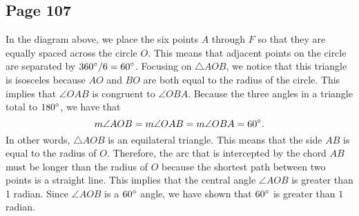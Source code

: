 \documentclass{article}
\newenvironment{solutions}[1]
{\subsection*{#1}
 \begin{enumerate}[leftmargin=1.5em]}
{\end{enumerate}}
\begin{document}
\begin{solutions}{Page 107}
In the diagram above, we place the six points $A$ through $F$ so that they are equally spaced across the circle $O$. This means that adjacent points on the circle are separated by $360\degree / 6 = 60\degree$. Focusing on $\triangle{AOB}$, we notice that this triangle is isosceles because $AO$ and $BO$ are both equal to the radius of the circle. This implies that $\angle{OAB}$ is congruent to $\angle{OBA}$. Because the three angles in a triangle total to $180\degree$, we have that
\[
m\angle{AOB} = m\angle{OAB} =  m\angle{OBA} = 60\degree.
\]
In other words, $\triangle{AOB}$ is an equilateral triangle. This means that the side $AB$ is equal to the radius of $O$. Therefore, the arc that is intercepted by the chord $AB$ must be longer than the radius of $O$ because the shortest path between two points is a straight line. This implies that the central angle $\angle{AOB}$ is greater than 1 radian. Since $\angle{AOB}$ is a $60\degree$ angle, we have shown that $60\degree$ is greater than $1$ radian.

\end{solutions}
\end{document}
